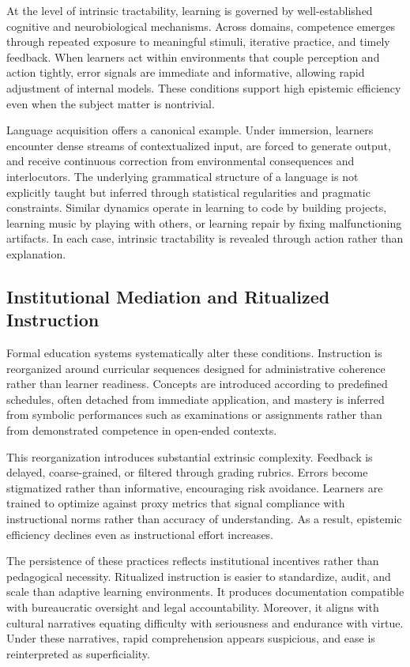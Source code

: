 \documentclass[11pt]{article}
\begin{document}
At the level of intrinsic tractability, learning is governed by well-established cognitive and neurobiological mechanisms. Across domains, competence emerges through repeated exposure to meaningful stimuli, iterative practice, and timely feedback. When learners act within environments that couple perception and action tightly, error signals are immediate and informative, allowing rapid adjustment of internal models. These conditions support high epistemic efficiency even when the subject matter is nontrivial.

Language acquisition offers a canonical example. Under immersion, learners encounter dense streams of contextualized input, are forced to generate output, and receive continuous correction from environmental consequences and interlocutors. The underlying grammatical structure of a language is not explicitly taught but inferred through statistical regularities and pragmatic constraints. Similar dynamics operate in learning to code by building projects, learning music by playing with others, or learning repair by fixing malfunctioning artifacts. In each case, intrinsic tractability is revealed through action rather than explanation.

\subsection{Institutional Mediation and Ritualized Instruction}

Formal education systems systematically alter these conditions. Instruction is reorganized around curricular sequences designed for administrative coherence rather than learner readiness. Concepts are introduced according to predefined schedules, often detached from immediate application, and mastery is inferred from symbolic performances such as examinations or assignments rather than from demonstrated competence in open-ended contexts.

This reorganization introduces substantial extrinsic complexity. Feedback is delayed, coarse-grained, or filtered through grading rubrics. Errors become stigmatized rather than informative, encouraging risk avoidance. Learners are trained to optimize against proxy metrics that signal compliance with instructional norms rather than accuracy of understanding. As a result, epistemic efficiency declines even as instructional effort increases.

The persistence of these practices reflects institutional incentives rather than pedagogical necessity. Ritualized instruction is easier to standardize, audit, and scale than adaptive learning environments. It produces documentation compatible with bureaucratic oversight and legal accountability. Moreover, it aligns with cultural narratives equating difficulty with seriousness and endurance with virtue. Under these narratives, rapid comprehension appears suspicious, and ease is reinterpreted as superficiality.
\end{document}
